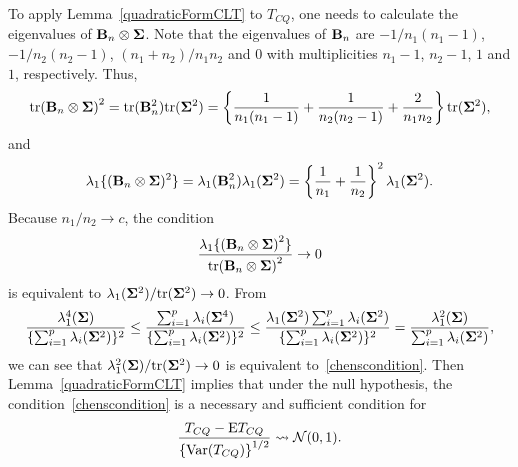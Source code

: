 \documentclass[times,sort&compress,3p]{elsarticle}
\newcommand{\mytr}{ {\rm tr} }
\newcommand{\myE}{ {\rm E} }
\theoremstyle{plain}
\theoremstyle{definition}
\theoremstyle{remark}
\begin{document}
To apply Lemma~\ref{quadraticFormCLT} to $T_{CQ}$, one needs to calculate the eigenvalues of $\mathbf{B}_n\otimes \boldsymbol{\Sigma}$.
Note that the eigenvalues of $\mathbf{B}_n$ are $-1/n_1(n_1-1)$, $-1/n_2(n_2-1)$, $(n_1+n_2)/n_1 n_2$ and $0$ with multiplicities $n_1-1$, $n_2-1$, $1$ and $1$, respectively.
    Thus,
    \begin{equation*}
        \mytr{(\BB_n\otimes \bSigma)}^2=\mytr(\BB_n^2)\mytr(\bSigma^2)=\left\{\frac{1}{n_1(n_1-1)}+\frac{1}{n_2(n_2-1)}+\frac{2}{n_1 n_2}\right\}\mytr (\bSigma^2),
    \end{equation*}
and
    \begin{equation*}
        \lambda_{1}\{(\mathbf{B}_n\otimes \boldsymbol{\Sigma})^2 \}=\lambda_{1}(\mathbf{B}_n^2)\lambda_{1}(\boldsymbol{\Sigma}^2)=\left\{\frac{1}{n_1}+\frac{1}{n_2}\right\}^2\lambda_{1}(\boldsymbol{\Sigma}^2).
    \end{equation*}
    Because $n_1/n_2\to c$, the condition
    $$
    \frac{\lambda_{1}\{{(\BB_n\otimes \bSigma)}^2 \}}{
\mytr{(\BB_n\otimes \bSigma)}^2}
         \to 0
    $$
    is equivalent to $\lambda_{1}(\bSigma^2)/\mytr (\bSigma^2)\to 0$.
From
$$
\frac{\lambda_1^4(\boldsymbol{\Sigma})}{\{\sum_{i=1}^p \lambda_i(\boldsymbol{\Sigma}^2)\}^2}
\leq
\frac{\sum_{i=1}^p\lambda_i(\boldsymbol{\Sigma}^4)}{\{\sum_{i=1}^p \lambda_i(\boldsymbol{\Sigma}^2) \}^2}
\leq
\frac{\lambda_1(\boldsymbol{\Sigma}^2)\sum_{i=1}^p\lambda_i(\boldsymbol{\Sigma}^2)}{\{\sum_{i=1}^p \lambda_i(\boldsymbol{\Sigma}^2)\}^2}
=
\frac{\lambda_1^2(\boldsymbol{\Sigma})}{\sum_{i=1}^p \lambda_i(\boldsymbol{\Sigma}^2)},
$$
    we can see that ${\lambda_{1}^2(\boldsymbol{\Sigma})}/{\mathrm{tr}(\boldsymbol{\Sigma}^2)}\to 0$  is equivalent to~\eqref{chenscondition}.
Then Lemma~\ref{quadraticFormCLT} implies that under the null hypothesis, the condition~\eqref{chenscondition} is a necessary and sufficient condition for 
    \begin{equation*}
        \frac{T_{CQ}-\myE T_{CQ}}{{\left\{\mathrm{Var}(T_{CQ})\right\}}^{1/2}}\rightsquigarrow \mathcal{N}(0,1).
    \end{equation*}
\end{document}
